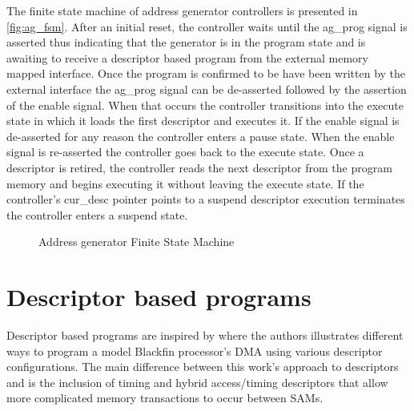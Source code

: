 The finite state machine of address generator controllers is presented in
\autoref{fig:ag_fsm}. After an initial reset, the controller waits until the
ag\_prog signal is asserted thus indicating that the generator is in the program
state and is awaiting to receive a descriptor based program from the external
memory mapped interface. Once the program is confirmed to be have been written
by the external interface the ag\_prog signal can be de-asserted followed by the
assertion of the enable signal. When that occurs the controller transitions into
the execute state in which it loads the first descriptor and executes it. If the
enable signal is de-asserted for any reason the controller enters a pause state.
When the enable signal is re-asserted the controller goes back to the execute
state. Once a descriptor is retired, the controller reads the next descriptor
from the program memory and begins executing it without leaving the execute
state. If the controller's cur\_desc pointer points to a suspend descriptor
execution terminates the controller enters a suspend state.

\begin{figure}
    \centering
    \caption{Address generator Finite State Machine}
    \label{fig:ag_fsm}
\end{figure}

\section{Descriptor based programs}
\label{chap:sams:programs}

Descriptor based programs are inspired by \cite{2d_dma_book} where the authors
illustrates different ways to program a model Blackfin processor's DMA using
various descriptor configurations. The main difference between this work's
approach to descriptors and \cite{2d_dma_book} is the inclusion of timing and
hybrid access/timing descriptors that allow more complicated memory transactions
to occur between SAMs.

